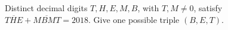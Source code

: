 Distinct decimal digits $ T,H,E,M,B $, with $ T,M\ne0 $, satisfy $\overline{THE}+\overline{MBMT}=2018 $. Give one possible triple $(B,E,T)$.
